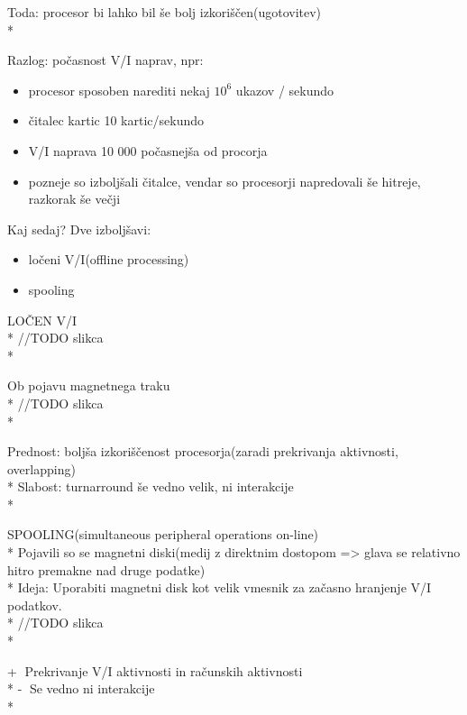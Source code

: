 \documentclass{article}
\begin{document}
Toda: procesor bi lahko bil še bolj izkoriščen(ugotovitev)\\*

Razlog: počasnost V/I naprav, npr: 
\begin{itemize}
  \item procesor sposoben narediti nekaj
    \begin{math}
    10^6
    \end{math}
    ukazov / sekundo

  \item čitalec kartic 10 kartic/sekundo

  \item V/I naprava 10 000 počasnejša od procorja

  \item pozneje so izboljšali čitalce, vendar so procesorji napredovali še hitreje, razkorak še večji
\end{itemize}

Kaj sedaj? Dve izboljšavi:
\begin{itemize}
  \item ločeni V/I(offline processing)
  \item spooling
\end{itemize}

LOČEN V/I\\*
//TODO slikca\\*

Ob pojavu magnetnega traku\\*
//TODO slikca\\*

Prednost: boljša izkoriščenost procesorja(zaradi prekrivanja aktivnosti, overlapping)\\*
Slabost: turnarround še vedno velik, ni interakcije\\*

SPOOLING(simultaneous peripheral operations on-line)\\*
Pojavili so se magnetni diski(medij z direktnim dostopom => glava se relativno hitro premakne nad druge podatke)\\*
Ideja: Uporabiti magnetni disk kot velik vmesnik za začasno hranjenje V/I podatkov.\\*
//TODO slikca\\*

\textcircled{+} Prekrivanje V/I aktivnosti in računskih aktivnosti\\*
\textcircled{-} Se vedno ni interakcije\\*
\end{document}
